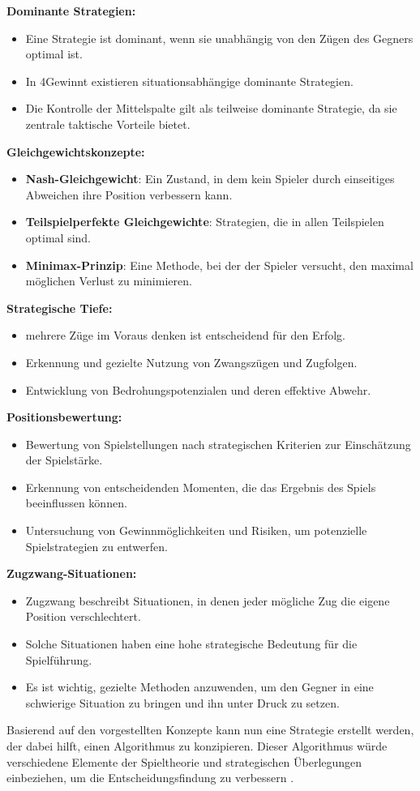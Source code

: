 \textbf{Dominante Strategien:}
\begin{itemize}
	\item Eine Strategie ist dominant, wenn sie unabhängig von den Zügen des Gegners optimal ist.
	\item In 4Gewinnt existieren situationsabhängige dominante Strategien.
	\item Die Kontrolle der Mittelspalte gilt als teilweise dominante Strategie, da sie zentrale taktische Vorteile bietet.
\end{itemize}

\textbf{Gleichgewichtskonzepte:}
\begin{itemize}
	\item \textbf{Nash-Gleichgewicht}: Ein Zustand, in dem kein Spieler durch einseitiges Abweichen ihre Position verbessern kann.
	\item \textbf{Teilspielperfekte Gleichgewichte}: Strategien, die in allen Teilspielen optimal sind.
	\item \textbf{Minimax-Prinzip}: Eine Methode, bei der der Spieler versucht, den maximal möglichen Verlust zu minimieren.
\end{itemize}

\textbf{Strategische Tiefe:}
\begin{itemize}
	\item mehrere Züge im Voraus denken ist entscheidend für den Erfolg.
	\item Erkennung und gezielte Nutzung von Zwangszügen und Zugfolgen.
	\item Entwicklung von Bedrohungspotenzialen und deren effektive Abwehr.
\end{itemize}

\textbf{Positionsbewertung:}
\begin{itemize}
	\item Bewertung von Spielstellungen nach strategischen Kriterien zur Einschätzung der Spielstärke.
	\item Erkennung von entscheidenden Momenten, die das Ergebnis des Spiels beeinflussen können.
	\item Untersuchung von Gewinnmöglichkeiten und Risiken, um potenzielle Spielstrategien zu entwerfen.
\end{itemize}

\textbf{Zugzwang-Situationen:}
\begin{itemize}
	\item Zugzwang beschreibt Situationen, in denen jeder mögliche Zug die eigene Position verschlechtert.
	\item Solche Situationen haben eine hohe strategische Bedeutung für die Spielführung.
	\item Es ist wichtig, gezielte Methoden anzuwenden, um den Gegner in eine schwierige Situation zu bringen und ihn unter Druck zu setzen.
\end{itemize}

Basierend auf den vorgestellten Konzepte kann nun eine Strategie erstellt werden, der dabei hilft, einen Algorithmus zu konzipieren. Dieser Algorithmus würde verschiedene Elemente der Spieltheorie und strategischen Überlegungen einbeziehen, um die Entscheidungsfindung zu verbessern \autocites{Winter2019}.